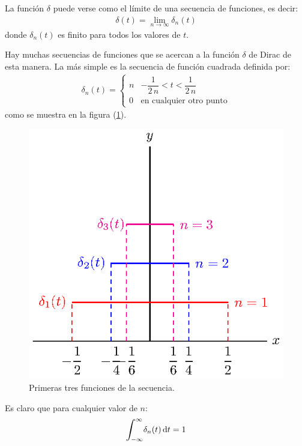 \documentclass[12pt]{article}
\def\scaleint#1{\vcenter{\hbox{\scaleto[3ex]{\displaystyle\int}{#1}}}}
\def\bs{\mkern-12mu}
\numberwithin{equation}{section}
\begin{document}
La función $\delta$ puede verse como el límite de una secuencia de funciones, es decir:
\begin{align}
\delta(t) = \lim_{n \to \infty} \delta_{n} (t)
\label{eq:ecuacion_05_10}
\end{align}
donde $\delta_{n}(t)$ es finito para todos los valores de $t$.
\par
Hay muchas secuencias de funciones que se acercan a la función $\delta$ de Dirac de esta manera. La más simple es la secuencia de función cuadrada definida por:
\begin{align}
\delta_{n} (t) = \begin{cases}
n & -\dfrac{1}{2 \, n} < t < \dfrac{1}{2 \, n} \\
0 & \mbox{en cualquier otro punto}
\end{cases}
\label{eq:ecuacion_05_11}
\end{align}
como se muestra en la figura (\ref{fig:figura_05_06}).
\begin{figure}[H]
    \centering
    \includegraphics[scale=1]{Imagenes/plot_secuencia_delta_02.eps}
    \caption{Primeras tres funciones de la secuencia.}
    \label{fig:figura_05_06}
\end{figure}
Es claro que para cualquier valor de $n$:
\begin{align}
\scaleint{6ex}_{\bs -\infty}^{\infty} \delta_{n} (t) \dd{t} = 1
\label{eq:ecuacion_05_12}
\end{align}
\end{document}
